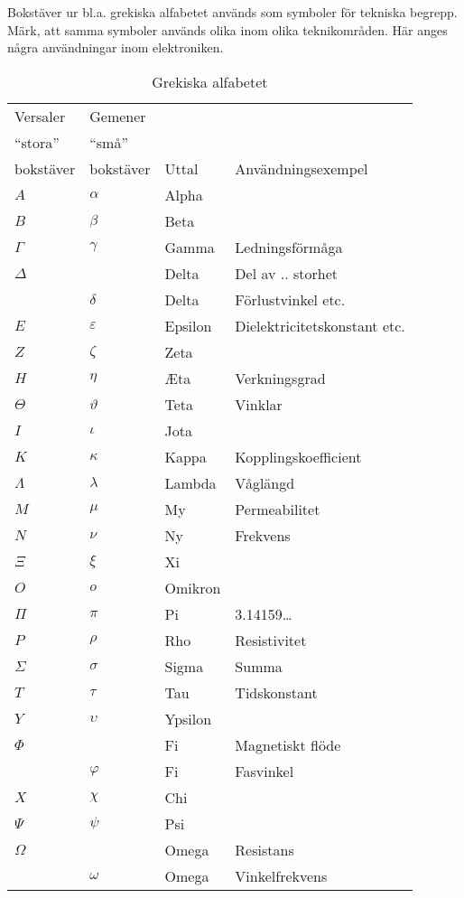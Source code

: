 \begin{table}
  \caption{Grekiska alfabetet}

  Bokstäver ur bl.a. grekiska alfabetet används som symboler för
  tekniska begrepp.  Märk, att samma symboler används olika inom olika
  teknikområden.  Här anges några användningar inom elektroniken.

  \begin{tabular}{ll|l|l}
    Versaler  & Gemener   &       & \\
    ``stora'' & ``små''   &       & \\
    bokstäver & bokstäver & Uttal & Användningsexempel \\
    \hline
    \(A\) & \(\alpha\) & Alpha & \\
    \(B\) & \(\beta\) & Beta & \\
    \(\Gamma\) & \(\gamma\) & Gamma & Ledningsförmåga \\
    \(\Delta\) & & Delta & Del av .. storhet \\
    & \(\delta\) & Delta & Förlustvinkel etc. \\
    \(E\) & \(\varepsilon\) & Epsilon & Dielektricitetskonstant etc.\\
    \(Z\) & \(\zeta\) & Zeta & \\
    \(H\) & \(\eta\) & \AE ta & Verkningsgrad\\
    \(\Theta\) & \(\vartheta\) & Teta & Vinklar \\
    \(I\) & \(\iota\) & Jota & \\
    \(K\) & \(\kappa\) & Kappa & Kopplingskoefficient \\
    \(\Lambda\) & \(\lambda\) & Lambda & Våglängd \\
    \(M\) & \(\mu\) & My & Permeabilitet \\
    \(N\) & \(\nu\) & Ny & Frekvens \\
    \(\Xi\) & \(\xi\) & Xi & \\
    \(O\) & \(o\) & Omikron & \\
    \(\Pi\) & \(\pi\) & Pi & 3.14159\dots \\
    \(P\) & \(\rho\) & Rho & Resistivitet \\
    \(\Sigma\) & \(\sigma\) & Sigma & Summa \\
    \(T\) & \(\tau\) & Tau & Tidskonstant \\
    \(Y\) & \(\upsilon\) & Ypsilon &  \\
    \(\Phi\) & & Fi & Magnetiskt flöde \\
    & \(\varphi\) & Fi & Fasvinkel \\
    \(X\) & \(\chi\) & Chi & \\
    \(\Psi\) & \(\psi\) & Psi & \\
    \(\Omega\) & & Omega & Resistans \\
    & \(\omega\) & Omega & Vinkelfrekvens \\
  \end{tabular}
\end{table}
